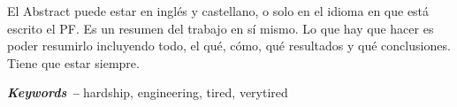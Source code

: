 \documentclass[../00_Main.tex]{subfiles}
\begin{document}
El Abstract puede estar en inglés y castellano, o solo en el idioma en que está escrito el PF.  Es un resumen del trabajo en sí mismo.  Lo que hay que hacer es poder resumirlo incluyendo todo, el qué, cómo, qué resultados y qué conclusiones.  Tiene que estar siempre.




\par\vspace*{\fill} %
\textbf{\textit{Keywords --}} hardship, engineering, tired, verytired %

\biblio %
\end{document}
